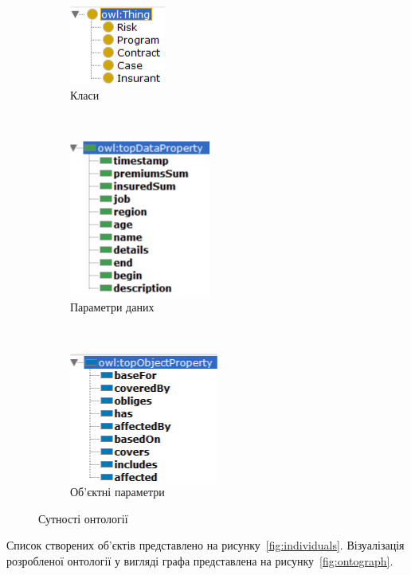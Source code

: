 \begin{figure}[H]
    \centering
    \begin{subfigure}[b]{0.3\textwidth}
        \includegraphics{class_props}
    \caption{Класи}
    \label{fig:class_props}
    \end{subfigure}
    ~
    \begin{subfigure}[b]{0.3\textwidth}
        \includegraphics{data_props}
    \caption{Параметри даних}
    \label{fig:data_props}
    \end{subfigure}
    ~
    \begin{subfigure}[b]{0.3\textwidth}
        \includegraphics{object_props}
    \caption{Об'єктні параметри}
    \label{fig:object_props}
    \end{subfigure}
    \caption{Сутності онтології}
\end{figure}

Список створених об'єктів представлено на рисунку~\ref{fig:individuals}. Візуалізація розробленої онтології у вигляді графа представлена на рисунку~\ref{fig:ontograph}.

